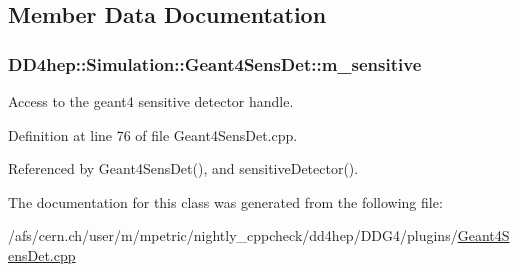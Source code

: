 \subsection{Member Data Documentation}
\hypertarget{class_d_d4hep_1_1_simulation_1_1_geant4_sens_det_a0790d04fc8724269797452cb89b91d39}{
\subsubsection[{m\_\-sensitive}]{ {\bf DD4hep::Simulation::Geant4SensDet::m\_\-sensitive}}}
\label{class_d_d4hep_1_1_simulation_1_1_geant4_sens_det_a0790d04fc8724269797452cb89b91d39}


Access to the geant4 sensitive detector handle. 

Definition at line 76 of file Geant4SensDet.cpp.

Referenced by Geant4SensDet(), and sensitiveDetector().

The documentation for this class was generated from the following file:\begin{DoxyCompactItemize}
\item 
/afs/cern.ch/user/m/mpetric/nightly\_\-cppcheck/dd4hep/DDG4/plugins/\hyperlink{_geant4_sens_det_8cpp}{Geant4SensDet.cpp}\end{DoxyCompactItemize}
